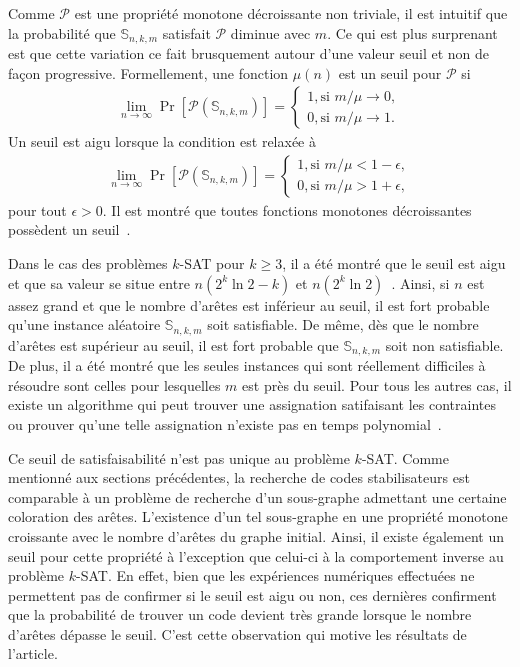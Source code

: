 Comme $\mathcal P$ est une propriété monotone décroissante non triviale,
il est intuitif que la probabilité que $\mathbb S_{n,k,m}$ satisfait 
$\mathcal P$ diminue avec $m$.
Ce qui est plus surprenant est que cette variation ce fait brusquement 
autour d'une valeur seuil et non de façon progressive.
Formellement,
une fonction $\mu(n)$ est un seuil pour $\mathcal P$ si 
\begin{align}
  \lim_{n \to \infty} \Pr[\mathcal P(\mathbb S_{n,k,m})] 
  =
  \begin{cases}
    1, \text{si } m / \mu \to 0, \\
    0, \text{si } m / \mu \to 1.
  \end{cases}
\end{align}
Un seuil est aigu lorsque la condition est relaxée à
\begin{align}
  \lim_{n \to \infty} \Pr[\mathcal P(\mathbb S_{n,k,m})] 
  =
  \begin{cases}
    1, \text{si } m / \mu < 1 - \epsilon, \\
    0, \text{si } m / \mu > 1 + \epsilon,
  \end{cases}
\end{align}
pour tout $\epsilon > 0$.
Il est montré que toutes fonctions monotones décroissantes
possèdent un seuil~\cite{bollobas_threshold_1987}.

Dans le cas des problèmes $k$-SAT pour $k \geq 3$,
il a été montré que le seuil est aigu et que sa valeur se
situe entre $n(2^k \ln 2 - k)$ et $n(2^k \ln 2)$~\cite{achlioptas_rigorous_2005}.
Ainsi, si $n$ est assez grand et que le nombre d'arêtes est inférieur au seuil,
il est fort probable qu'une instance aléatoire $\mathbb S_{n,k,m}$ soit satisfiable.
De même,
dès que le nombre d'arêtes est supérieur au seuil,
il est fort probable que $\mathbb S_{n, k, m}$ soit non satisfiable.
De plus, il a été montré que les seules instances qui sont réellement difficiles
à résoudre sont celles pour lesquelles $m$ est près du seuil.
Pour tous les autres cas,
il existe un algorithme qui peut trouver une assignation satifaisant les contraintes
ou prouver qu'une telle assignation n'existe pas en temps polynomial~\cite{cheeseman_where_1991}.

Ce seuil de satisfaisabilité n'est pas unique au problème $k$-SAT.
Comme mentionné aux sections précédentes,
la recherche de codes stabilisateurs est comparable à un problème de recherche d'un sous-graphe
admettant une certaine coloration des arêtes.
L'existence d'un tel sous-graphe
en une propriété monotone croissante avec le nombre d'arêtes du graphe initial.
Ainsi,
il existe également un seuil pour cette propriété à l'exception que celui-ci à la comportement 
inverse au problème $k$-SAT.
En effet,
bien que les expériences numériques effectuées ne permettent pas de confirmer si le seuil 
est aigu ou non,
ces dernières confirment que la probabilité de trouver un code devient
très grande lorsque le nombre d'arêtes dépasse le seuil.
C'est cette observation qui motive les résultats de l'article.

